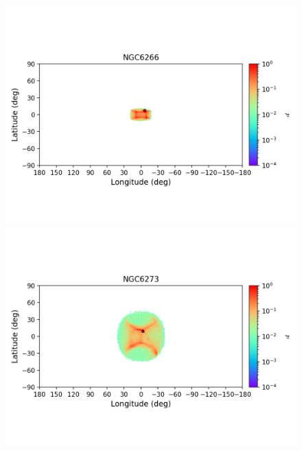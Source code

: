         \begin{figure}
            \begin{center}
                \includegraphics[clip=true, trim = 0mm 20mm 0mm 10mm, width=1\columnwidth]{images/error_plots_NGC6266.png}
                \includegraphics[clip=true, trim = 0mm 20mm 0mm 10mm, width=1\columnwidth]{images/error_plots_NGC6273.png}
                

\end{center}
\end{figure}
